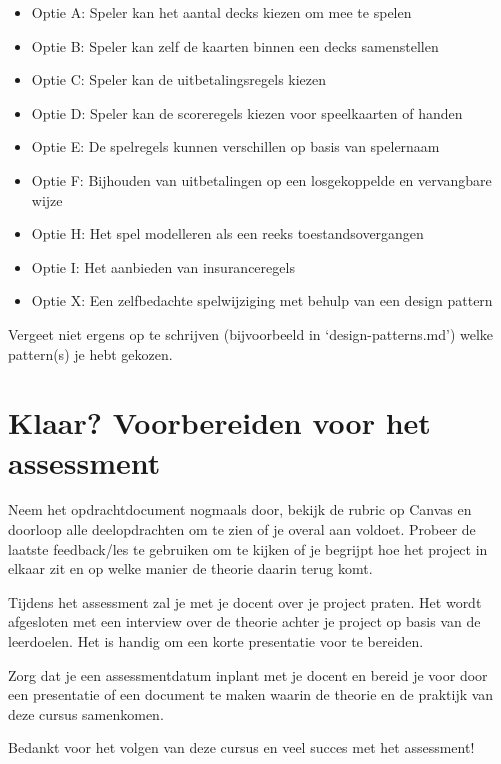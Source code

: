 \documentclass[dutch,a4paper,12pt,doubleside]{book}
\begin{document}
\begin{itemize}
    \item Optie A: Speler kan het aantal decks kiezen om mee te spelen
    \item Optie B: Speler kan zelf de kaarten binnen een decks samenstellen
    \item Optie C: Speler kan de uitbetalingsregels kiezen
    \item Optie D: Speler kan de scoreregels kiezen voor speelkaarten of handen
    \item Optie E: De spelregels kunnen verschillen op basis van spelernaam
    \item Optie F: Bijhouden van uitbetalingen op een losgekoppelde en vervangbare wijze
    \item Optie H: Het spel modelleren als een reeks toestandsovergangen
    \item Optie I: Het aanbieden van insuranceregels
    \item Optie X: Een zelfbedachte spelwijziging met behulp van een design pattern    
\end{itemize}

Vergeet niet ergens op te schrijven (bijvoorbeeld in `design-patterns.md')
welke pattern(s) je hebt gekozen.

\newpage
\section{Klaar? Voorbereiden voor het assessment}
Neem het opdrachtdocument nogmaals door, bekijk de rubric op Canvas en doorloop alle deelopdrachten 
om te zien of je overal aan voldoet. 
Probeer de laatste feedback/les te gebruiken om te kijken of je begrijpt hoe het project in elkaar
zit en op welke manier de theorie daarin terug komt.

Tijdens het assessment zal je met je docent over je project praten.
Het wordt afgesloten met een interview over de theorie achter je project
op basis van de leerdoelen.
Het is handig om een korte presentatie voor te bereiden.

Zorg dat je een assessmentdatum inplant met je docent en bereid je voor door een presentatie of 
een document te maken waarin de theorie en de praktijk van deze cursus samenkomen.

Bedankt voor het volgen van deze cursus en veel succes met het assessment!
\end{document}
